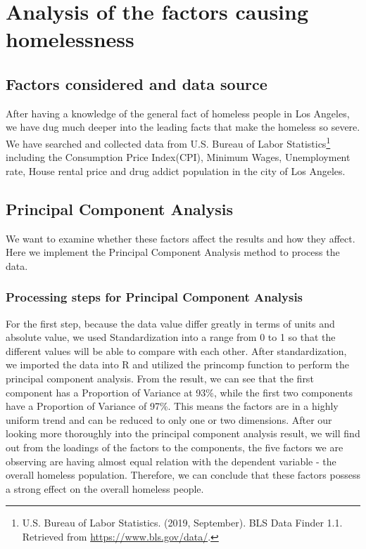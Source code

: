 \documentclass[]{article}
\let\rmarkdownfootnote\footnote%
\def\footnote{\protect\rmarkdownfootnote}
\begin{document}
\hypertarget{analysis-of-the-factors-causing-homelessness}{%
\section{Analysis of the factors causing
homelessness}\label{analysis-of-the-factors-causing-homelessness}}

\hypertarget{factors-considered-and-data-source}{%
\subsection{Factors considered and data
source}\label{factors-considered-and-data-source}}

After having a knowledge of the general fact of homeless people in Los
Angeles, we have dug much deeper into the leading facts that make the
homeless so severe. We have searched and collected data from U.S. Bureau
of Labor Statistics\footnote{U.S. Bureau of Labor Statistics. (2019,
  September). BLS Data Finder 1.1. Retrieved from
  \url{https://www.bls.gov/data/}.} including the Consumption Price
Index(CPI), Minimum Wages, Unemployment rate, House rental price and
drug addict population in the city of Los Angeles.

\hypertarget{principal-component-analysis}{%
\subsection{Principal Component
Analysis}\label{principal-component-analysis}}

We want to examine whether these factors affect the results and how they
affect. Here we implement the Principal Component Analysis method to
process the data.

\hypertarget{processing-steps-for-principal-component-analysis}{%
\subsubsection{Processing steps for Principal Component
Analysis}\label{processing-steps-for-principal-component-analysis}}

For the first step, because the data value differ greatly in terms of
units and absolute value, we used Standardization into a range from 0 to
1 so that the different values will be able to compare with each other.
After standardization, we imported the data into R and utilized the
princomp function to perform the principal component analysis. From the
result, we can see that the first component has a Proportion of Variance
at 93\%, while the first two components have a Proportion of Variance of
97\%. This means the factors are in a highly uniform trend and can be
reduced to only one or two dimensions. After our looking more thoroughly
into the principal component analysis result, we will find out from the
loadings of the factors to the components, the five factors we are
observing are having almost equal relation with the dependent variable -
the overall homeless population. Therefore, we can conclude that these
factors possess a strong effect on the overall homeless people.
\end{document}
